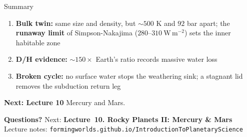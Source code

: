 \documentclass[aspectratio=169, 11pt]{beamer}
\begin{document}
\begin{frame}
\end{frame}

\begin{frame}{Summary}
  \begin{enumerate}\setlength\itemsep{6pt}
    \item \textbf{Bulk twin:} same size and density, but $\sim 500$ K and $92$ bar apart; the \textbf{runaway limit} of Simpson-Nakajima ($280$--$310\ \mathrm{W\,m^{-2}}$) sets the inner habitable zone
    \item \textbf{D/H evidence:} $\sim 150\times$ Earth's ratio records massive water loss
    \item \textbf{Broken cycle:} no surface water stops the weathering sink; a stagnant lid removes the subduction return leg
  \end{enumerate}
  \vskip8pt
  \textbf{Next: Lecture 10} Mercury and Mars.
\end{frame}

\begin{frame}
  \vfill
  \begin{center}
    {\color{white}\Large\bfseries Questions?}
    \vskip20pt
    {\color{ipsLightFill}\normalsize Next: \textbf{Lecture~10. Rocky Planets II: Mercury \& Mars}}
    \vskip16pt
    {\color{ipsLightFill!70}\small Lecture notes: \texttt{formingworlds.github.io/IntroductionToPlanetaryScience}}
  \end{center}
  \vfill
\end{frame}
\end{document}
